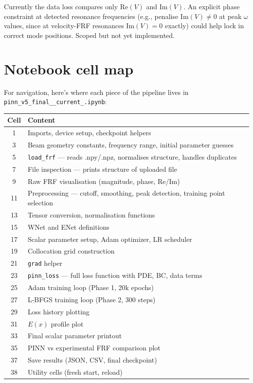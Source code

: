 \documentclass[11pt,a4paper]{article}
\begin{document}
Currently the data loss compares only $\text{Re}(V)$ and $\text{Im}(V)$. An explicit phase constraint at detected resonance frequencies (e.g., penalise $\text{Im}(V) \neq 0$ at peak $\omega$ values, since at velocity-FRF resonances $\text{Im}(V) = 0$ exactly) could help lock in correct mode positions. Scoped but not yet implemented.

\appendix
\section{Notebook cell map}

For navigation, here's where each piece of the pipeline lives in \texttt{pinn\_v5\_final\_\_current\_.ipynb}:

\begin{longtable}{cl}
\toprule
\textbf{Cell} & \textbf{Content} \\
\midrule
\endhead
1  & Imports, device setup, checkpoint helpers \\
3  & Beam geometry constants, frequency range, initial parameter guesses \\
5  & \texttt{load\_frf} --- reads .npy/.npz, normalises structure, handles duplicates \\
7  & File inspection --- prints structure of uploaded file \\
9  & Raw FRF visualisation (magnitude, phase, Re/Im) \\
11 & Preprocessing --- cutoff, smoothing, peak detection, training point selection \\
13 & Tensor conversion, normalisation functions \\
15 & WNet and ENet definitions \\
17 & Scalar parameter setup, Adam optimizer, LR scheduler \\
19 & Collocation grid construction \\
21 & \texttt{grad} helper \\
23 & \texttt{pinn\_loss} --- full loss function with PDE, BC, data terms \\
25 & Adam training loop (Phase 1, 20k epochs) \\
27 & L-BFGS training loop (Phase 2, 300 steps) \\
29 & Loss history plotting \\
31 & $E(x)$ profile plot \\
33 & Final scalar parameter printout \\
35 & PINN vs experimental FRF comparison plot \\
37 & Save results (JSON, CSV, final checkpoint) \\
38 & Utility cells (fresh start, reload) \\
\bottomrule
\end{longtable}
\end{document}
